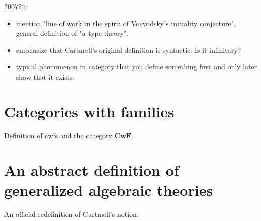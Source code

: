\documentclass{lmcs}
\def\Cwf{\mathbf{CwF}}
\begin{document}
200724: 
\begin{itemize}
\item mention "line of work in the spirit of Voevodsky's initiality conjecture", general definition of "a type theory".
\item emphasize that Cartmell's original definition is syntactic. Is it infinitary?
\item typical phenomenon in category that you define something first and only later show that it exists.
\end{itemize}

\section{Categories with families}

Definition of cwfs and the category $\Cwf$.

\section{An abstract definition of generalized algebraic theories}

An official redefinition of Cartmell's notion. 
\end{document}
